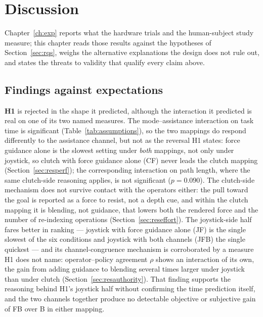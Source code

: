 \chapter{Discussion}
\label{ch:discussion}

Chapter~\ref{ch:exp} reports what the hardware trials and the human-subject study measure; this chapter reads those results against the hypotheses of Section~\ref{sec:rqs}, weighs the alternative explanations the design does not rule out, and states the threats to validity that qualify every claim above.

\section{Findings against expectations}
\label{sec:discussion-expectations}

\textbf{H1} is rejected in the shape it predicted, although the interaction it predicted is real on one of its two named measures. The mode--assistance interaction on task time is significant (Table~\ref{tab:assumptions}), so the two mappings do respond differently to the assistance channel, but not as the reversal H1 states: force guidance alone is the slowest setting under \emph{both} mappings, not only under joystick, so clutch with force guidance alone (CF) never leads the clutch mapping (Section~\ref{sec:resperf}); the corresponding interaction on path length, where the same clutch-side reasoning applies, is not significant ($p=0.090$). The clutch-side mechanism does not survive contact with the operators either: the pull toward the goal is reported as a force to resist, not a depth cue, and within the clutch mapping it is blending, not guidance, that lowers both the rendered force and the number of re-indexing operations (Section~\ref{sec:reseffort}). The joystick-side half fares better in ranking --- joystick with force guidance alone (JF) is the single slowest of the six conditions and joystick with both channels (JFB) the single quickest --- and its channel-congruence mechanism is corroborated by a measure H1 does not name: operator--policy agreement $\rho$ shows an interaction of its own, the gain from adding guidance to blending several times larger under joystick than under clutch (Section~\ref{sec:resauthority}). That finding supports the reasoning behind H1's joystick half without confirming the time prediction itself, and the two channels together produce no detectable objective or subjective gain of FB over B in either mapping.

